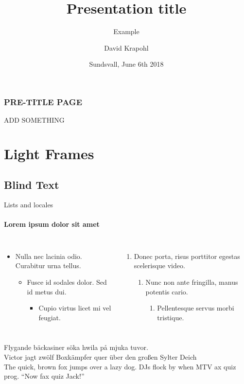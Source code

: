 \documentclass[xcolor=svgnames,10pt,aspectratio=169]{beamer}
\title{Presentation title}
\subtitle{Example}
\author{David Krapohl}
\date{Sundsvall, June 6th 2018}
\institute{Electronic design division}
\begin{document}
  \begin{frame}[plain]
      \frametitle{PRE-TITLE PAGE}
      ADD SOMETHING
  \end{frame}

  \frame{\maketitle}



    \section{Light Frames}
    \subsection{Blind Text}

    \begin{frame}[label=lists]{Lists and locales}
      \framesubtitle{Lorem ipsum dolor sit amet}
      \begin{columns}[onlytextwidth]
          \begin{itemize}
            \item Nulla nec lacinia odio. Curabitur urna tellus.
            \begin{itemize}
              \item Fusce id sodales dolor. Sed id metus dui.
              \begin{itemize}
                \item Cupio virtus licet mi vel feugiat.
              \end{itemize}
            \end{itemize}
          \end{itemize}
          \begin{enumerate}
            \item Donec porta, risus porttitor egestas scelerisque video.
            \begin{enumerate}
              \item Nunc non ante fringilla, manus potentis cario.
              \begin{enumerate}
                \item Pellentesque servus morbi tristique.
              \end{enumerate}
            \end{enumerate}
          \end{enumerate}
      \end{columns}
      \bigskip
      {Flygande bäckasiner söka hwila på mjuka tuvor.}\\
      {Victor jagt zwölf Boxkämpfer quer über den großen Sylter Deich}\\
      {The quick, brown fox jumps over a lazy
      dog. DJs flock by when MTV ax quiz prog. “Now fax quiz Jack!”}
    \end{frame}
\end{document}
